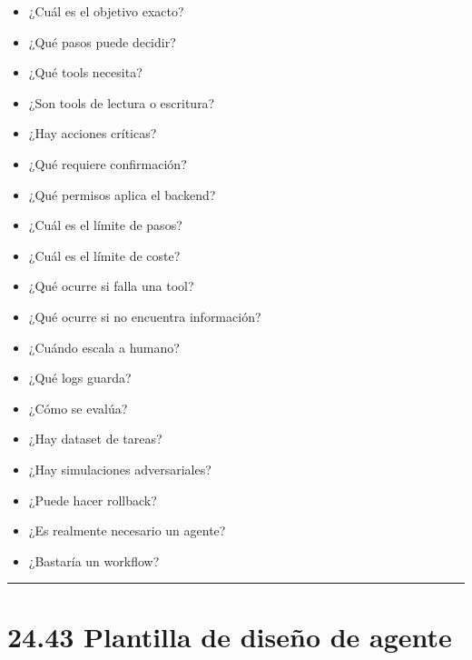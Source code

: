 \begin{itemize}
\tightlist
\item
  ¿Cuál es el objetivo exacto?
\item
  ¿Qué pasos puede decidir?
\item
  ¿Qué tools necesita?
\item
  ¿Son tools de lectura o escritura?
\item
  ¿Hay acciones críticas?
\item
  ¿Qué requiere confirmación?
\item
  ¿Qué permisos aplica el backend?
\item
  ¿Cuál es el límite de pasos?
\item
  ¿Cuál es el límite de coste?
\item
  ¿Qué ocurre si falla una tool?
\item
  ¿Qué ocurre si no encuentra información?
\item
  ¿Cuándo escala a humano?
\item
  ¿Qué logs guarda?
\item
  ¿Cómo se evalúa?
\item
  ¿Hay dataset de tareas?
\item
  ¿Hay simulaciones adversariales?
\item
  ¿Puede hacer rollback?
\item
  ¿Es realmente necesario un agente?
\item
  ¿Bastaría un workflow?
\end{itemize}

\begin{center}\rule{0.5\linewidth}{0.5pt}\end{center}

\section{24.43 Plantilla de diseño de
agente}\label{plantilla-de-diseuxf1o-de-agente}

